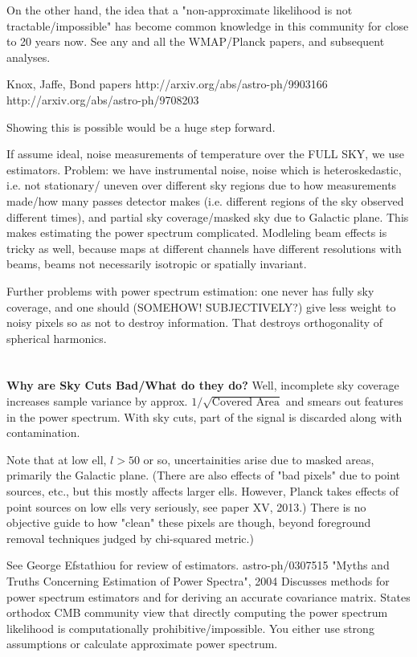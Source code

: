 \documentclass[a4paper, 11pt]{article}
\begin{document}
On the other hand, the idea that a "non-approximate likelihood is not tractable/impossible" has become common knowledge in this community for close to 20 years now. See any and all the WMAP/Planck papers, and subsequent analyses. 

Knox, Jaffe, Bond papers
http://arxiv.org/abs/astro-ph/9903166
http://arxiv.org/abs/astro-ph/9708203

Showing this is possible would be a huge step forward. 

If assume ideal, noise measurements of temperature over the FULL SKY, we use estimators. Problem: we have instrumental noise, noise which is heteroskedastic, i.e. not stationary/ uneven over different sky regions due to how measurements made/how many passes detector makes (i.e. different regions of the sky observed different times), and partial sky coverage/masked sky due to Galactic plane. This makes estimating the power spectrum complicated. Modleling beam effects is tricky as well, because maps at different channels have different resolutions with beams, beams not necessarily isotropic or spatially invariant. 

Further problems with power spectrum estimation: one never has fully sky coverage, and one should (SOMEHOW! SUBJECTIVELY?) give less weight to noisy pixels so as not to destroy information. That destroys orthogonality of spherical harmonics. 

\paragraph{} \hspace{0pt} \\

\textbf{Why are Sky Cuts Bad/What do they do?}
Well, incomplete sky coverage increases sample variance by approx. $1/\sqrt{\text{Covered \ Area}}$ and smears out features in the power spectrum. 
With sky cuts, part of the signal is discarded along with contamination.

Note that at low ell, $l>50$ or so, uncertainities arise due to masked areas, primarily the Galactic plane. (There are also effects of "bad pixels" due to point sources, etc., but this mostly affects larger ells. However, Planck takes effects of point sources on low ells very seriously, see paper XV, 2013.)  There is no objective guide to how "clean" these pixels are though, beyond foreground removal techniques judged by chi-squared metric.)

See George Efstathiou for review of estimators. astro-ph/0307515
"Myths and Truths Concerning Estimation of Power Spectra", 2004
Discusses methods for power spectrum estimators and for deriving an accurate covariance matrix. States orthodox CMB community view that directly computing the power spectrum likelihood is computationally prohibitive/impossible. You either use strong assumptions or calculate approximate power spectrum. 
\end{document}
